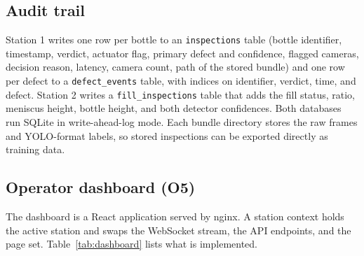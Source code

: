 \subsection{Audit trail}
Station 1 writes one row per bottle to an \texttt{inspections} table (bottle identifier, timestamp, verdict, actuator flag, primary defect and confidence, flagged cameras, decision reason, latency, camera count, path of the stored bundle) and one row per defect to a \texttt{defect\_events} table, with indices on identifier, verdict, time, and defect. Station 2 writes a \texttt{fill\_inspections} table that adds the fill status, ratio, meniscus height, bottle height, and both detector confidences. Both databases run SQLite in write-ahead-log mode. Each bundle directory stores the raw frames and YOLO-format labels, so stored inspections can be exported directly as training data.

\subsection{Operator dashboard (O5)}
\label{sec:dashboard}
The dashboard is a React application served by nginx. A station context holds the active station and swaps the WebSocket stream, the API endpoints, and the page set. Table~\ref{tab:dashboard} lists what is implemented.

